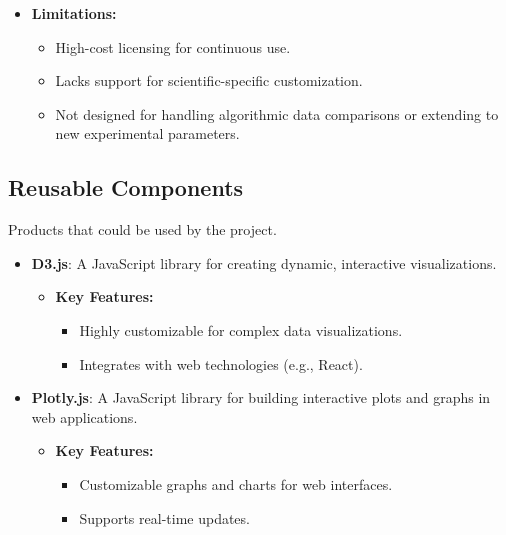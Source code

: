 \documentclass[12pt]{article}
\begin{document}
\begin{itemize}
\begin{itemize}
        \item \textbf{Limitations:}
        \begin{itemize}
            \item High-cost licensing for continuous use.
            \item Lacks support for scientific-specific customization.
            \item Not designed for handling algorithmic data comparisons or
            extending to new experimental parameters.
        \end{itemize}
    \end{itemize}
\end{itemize}

\subsection{Reusable Components}

Products that could be used by the project.


\begin{itemize}
    \item \textbf{D3.js}: A JavaScript library for creating dynamic, interactive
    visualizations.
    
    \begin{itemize}
        \item \textbf{Key Features:}
        \begin{itemize}
            \item Highly customizable for complex data visualizations.
            \item Integrates with web technologies (e.g., React).
        \end{itemize}
    \end{itemize}

    \item \textbf{Plotly.js}: A JavaScript library for building interactive
    plots and graphs in web applications.
    
    \begin{itemize}
        \item \textbf{Key Features:}
        \begin{itemize}
            \item Customizable graphs and charts for web interfaces.
            \item Supports real-time updates.
        \end{itemize}
    \end{itemize}
\end{itemize}
\end{document}
